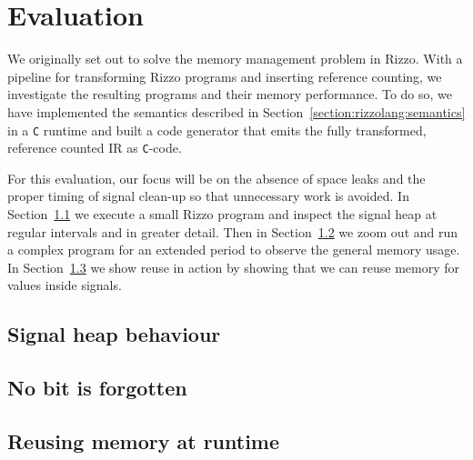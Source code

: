\section{Evaluation}


We originally set out to solve the memory management problem in Rizzo. 
With a pipeline for transforming Rizzo programs and inserting reference counting, we investigate the resulting programs and their memory performance.
To do so, we have implemented the semantics described in Section~\ref{section:rizzolang:semantics} in a \verb|C| runtime and built a code generator that emits the fully transformed, reference counted IR as \verb|C|-code.

For this evaluation, our focus will be on the absence of space leaks and the proper timing of signal clean-up so that unnecessary work is avoided. 
In Section~\ref{section:eval:heap_behaviour} we execute a small Rizzo program and inspect the signal heap at regular intervals and in greater detail.
Then in Section~\ref{section:eval:no_space_leaks} we zoom out and run a complex program for an extended period to observe the general memory usage.
In Section~\ref{section:eval:reuse} we show reuse in action by showing that we can reuse memory for values inside signals.

\subsection{Signal heap behaviour}\label{section:eval:heap_behaviour}



\subsection{No bit is forgotten}\label{section:eval:no_space_leaks}



\subsection{Reusing memory at runtime}\label{section:eval:reuse}


